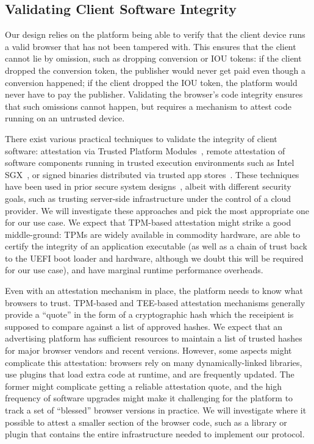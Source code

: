 \subsection{Validating Client Software Integrity}
\label{s:attest}
%
Our design relies on the platform being able to verify that the client device runs a valid browser that has not been tampered with.
%
This ensures that the client cannot lie by omission, such as dropping conversion or IOU tokens: if the client dropped the conversion token, the publisher would never get paid even though a conversion happened; if the client dropped the IOU token, the platform would never have to pay the publisher.
%
Validating the browser's code integrity ensures that such omissions cannot happen, but requires a mechanism to attest code running on an untrusted device.
%

%
There exist various practical techniques to validate the integrity of client software: attestation via Trusted Platform Modules~\cite{tpm}, remote attestation of software components running in trusted execution environments such as Intel SGX~\cite{sgx}, or signed binaries distributed via trusted app stores~\cite{ios-security}.
%
These techniques have been used in prior secure system designs~\cite{riverbed, ryoan}, albeit with different security goals, such as trusting server-side infrastructure under the control of a cloud provider.
%
We will investigate these approaches and pick the most appropriate one for our use case.
%
We expect that TPM-based attestation might strike a good middle-ground: TPMs are widely available in commodity hardware, are able to certify the integrity of an application executable (as well as a chain of trust back to the UEFI boot loader and hardware, although we doubt this will be required for our use case), and have marginal runtime performance overheads.
%

%
Even with an attestation mechanism in place, the platform needs to know what browsers to trust.
%
TPM-based and TEE-based attestation mechanisms generally provide a ``quote'' in the form of a cryptographic hash which the receipient is supposed to compare against a list of approved hashes.
%
We expect that an advertising platform has sufficient resources to maintain a list of trusted hashes for major browser vendors and recent versions.
%
However, some aspects might complicate this attestation: browsers rely on many dynamically-linked libraries, use plugins that load extra code at runtime, and are frequently updated.
%
The former might complicate getting a reliable attestation quote, and the high frequency of software upgrades might make it challenging for the platform to track a set of ``blessed'' browser versions in practice.
%
We will investigate where it possible to attest a smaller section of the browser code, such as a library or plugin that contains the entire infrastructure needed to implement our protocol.
%

